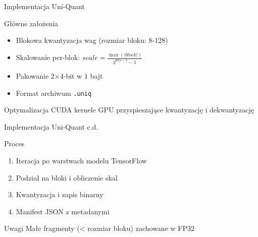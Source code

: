 \documentclass{beamer}
\begin{document}
\begin{frame}{Implementacja Uni-Quant}
    \begin{block}{Główne założenia}
        \begin{itemize}
            \item Blokowa kwantyzacja wag (rozmiar bloku: 8-128)
            \item Skalowanie per-blok: $\mathit{scale} = \frac{\max(|\mathit{block}|)}{2^{\mathit{bits}-1} - 1}$
            \item Pakowanie 2$\times$4-bit w 1 bajt
            \item Format archiwum \texttt{.uniq}
        \end{itemize}
    \end{block}
    
    \begin{alertblock}{Optymalizacja CUDA}
        kernele GPU przyspieszające kwantyzację i dekwantyzację
    \end{alertblock}
\end{frame}

\begin{frame}{Implementacja Uni-Quant c.d.}
    
    \begin{block}{Proces}
        \begin{enumerate}
            \item Iteracja po warstwach modelu TensorFlow
            \item Podział na bloki i obliczenie skal
            \item Kwantyzacja i zapis binarny
            \item Manifest JSON z metadanymi
        \end{enumerate}
    \end{block}
    
    \begin{exampleblock}{Uwagi}
        Małe fragmenty (< rozmiar bloku) zachowane w FP32
    \end{exampleblock}
\end{frame}
\end{document}
